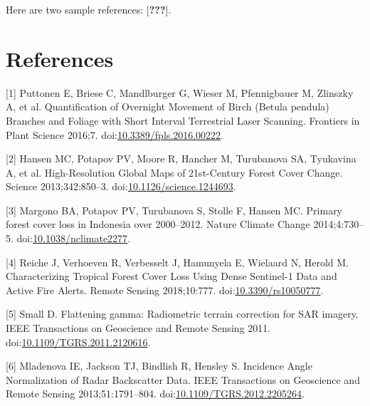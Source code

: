 \documentclass[]{elsarticle} %
\begin{document}
Here are two sample references: {[}{\textbf{???}}{]}.

\hypertarget{references}{%
\section*{References}\label{references}}

\hypertarget{refs}{}
\leavevmode\hypertarget{ref-Puttonen2016}{}%
{[}1{]} Puttonen E, Briese C, Mandlburger G, Wieser M, Pfennigbauer M,
Zlinszky A, et al. Quantification of Overnight Movement of Birch (Betula
pendula) Branches and Foliage with Short Interval Terrestrial Laser
Scanning. Frontiers in Plant Science 2016;7.
doi:\href{https://doi.org/10.3389/fpls.2016.00222}{10.3389/fpls.2016.00222}.

\leavevmode\hypertarget{ref-Hansen2013}{}%
{[}2{]} Hansen MC, Potapov PV, Moore R, Hancher M, Turubanova SA,
Tyukavina A, et al. High-Resolution Global Maps of 21st-Century Forest
Cover Change. Science 2013;342:850--3.
doi:\href{https://doi.org/10.1126/science.1244693}{10.1126/science.1244693}.

\leavevmode\hypertarget{ref-Margono2014}{}%
{[}3{]} Margono BA, Potapov PV, Turubanova S, Stolle F, Hansen MC.
Primary forest cover loss in Indonesia over 2000--2012. Nature Climate
Change 2014;4:730--5.
doi:\href{https://doi.org/10.1038/nclimate2277}{10.1038/nclimate2277}.

\leavevmode\hypertarget{ref-Reiche2018}{}%
{[}4{]} Reiche J, Verhoeven R, Verbesselt J, Hamunyela E, Wielaard N,
Herold M. Characterizing Tropical Forest Cover Loss Using Dense
Sentinel-1 Data and Active Fire Alerts. Remote Sensing 2018;10:777.
doi:\href{https://doi.org/10.3390/rs10050777}{10.3390/rs10050777}.

\leavevmode\hypertarget{ref-Small2011}{}%
{[}5{]} Small D. Flattening gamma: Radiometric terrain correction for
SAR imagery. IEEE Transactions on Geoscience and Remote Sensing 2011.
doi:\href{https://doi.org/10.1109/TGRS.2011.2120616}{10.1109/TGRS.2011.2120616}.

\leavevmode\hypertarget{ref-Mladenova2013}{}%
{[}6{]} Mladenova IE, Jackson TJ, Bindlish R, Hensley S. Incidence Angle
Normalization of Radar Backscatter Data. IEEE Transactions on Geoscience
and Remote Sensing 2013;51:1791--804.
doi:\href{https://doi.org/10.1109/TGRS.2012.2205264}{10.1109/TGRS.2012.2205264}.
\end{document}
